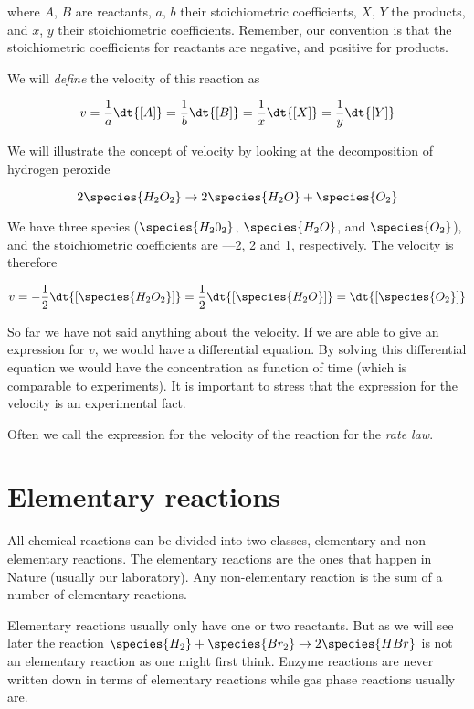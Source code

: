 where $A$, $B$ are reactants, $a$, $b$ their stoichiometric
coefficients, $X$, $Y$ the products, and $x$, $y$ their stoichiometric
coefficients. Remember, our convention is that the stoichiometric
coefficients for reactants are negative, and positive for products.

We will \textit{define} the velocity of this reaction as

\begin{equation}
  \label{eq:velocity}
  v = \frac{1}{a}\dt{[A]} = \frac{1}{b}\dt{[B]} = \frac{1}{x}\dt{[X]} = \frac{1}{y}\dt{[Y]}
\end{equation}

\begin{example}
  We will illustrate the concept of velocity by looking at the decomposition of hydrogen peroxide \ie

  \[
      2\species{H_2O_2} \rightarrow 2\species{H_2O} + \species{O_2}
  \]

  We have three species ($\species{H_20_2}$, $\species{H_2O}$, and $\species{O_2}$), and
  the stoichiometric coefficients are —2, 2 and 1, respectively. The
  velocity is therefore

  \[
    v = -\frac{1}{2}\dt{[\species{H_2O_2}]} = \frac{1}{2}\dt{[\species{H_2O}]} = \dt{[\species{O_2}]}
  \]
\end{example}

So far we have not said anything about the velocity. If we are able to
give an expression for $v$, we would have a differential equation. By
solving this differential equation we would have the concentration as
function of time (which is comparable to experiments). It is important
to stress that the expression for the velocity is an experimental
fact.

Often we call the expression for the velocity of the reaction for the
\textit{rate law}.

\section{Elementary reactions}
\label{sec:elementaryReactions}

All chemical reactions can be divided into two classes, elementary and
non-elementary reactions. The elementary reactions are the ones that
happen in Nature (usually our laboratory). Any non-elementary reaction
is the sum of a number of elementary reactions.

Elementary reactions usually only have one or two reactants. But as we
will see later the reaction $\species{H_2} + \species{Br_2} \rightarrow 2\species{HBr}$ is not an
elementary reaction as one might first think. Enzyme reactions are
never written down in terms of elementary reactions while gas phase
reactions usually are.

